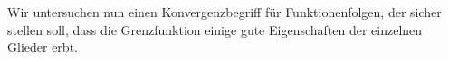 \documentclass[../main.tex]{subfiles}
\begin{document}
Wir untersuchen nun einen Konvergenzbegriff für Funktionenfolgen,
der sicher stellen soll, dass die Grenzfunktion einige gute Eigenschaften
der einzelnen Glieder erbt.



%   
\end{document}
